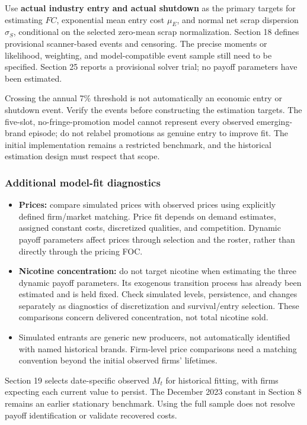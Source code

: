 \documentclass[10pt,]{article}
\providecommand{\tightlist}{%
  \setlength{\itemsep}{0pt}\setlength{\parskip}{0pt}}
\begin{document}
Use \textbf{actual industry entry and actual shutdown} as the primary
targets for estimating \(FC\), exponential mean entry cost \(\mu_E\),
and normal net scrap dispersion \(\sigma_S\), conditional on the
selected zero-mean scrap normalization. Section 18 defines provisional
scanner-based events and censoring. The precise moments or likelihood,
weighting, and model-compatible event sample still need to be specified.
Section 25 reports a provisional solver trial; no payoff parameters have
been estimated.

Crossing the annual 7\% threshold is not automatically an economic entry
or shutdown event. Verify the events before constructing the estimation
targets. The five-slot, no-fringe-promotion model cannot represent every
observed emerging-brand episode; do not relabel promotions as genuine
entry to improve fit. The initial implementation remains a restricted
benchmark, and the historical estimation design must respect that scope.

\subsubsection{Additional model-fit
diagnostics}\label{additional-model-fit-diagnostics}

\begin{itemize}
\tightlist
\item
  \textbf{Prices:} compare simulated prices with observed prices using
  explicitly defined firm/market matching. Price fit depends on demand
  estimates, assigned constant costs, discretized qualities, and
  competition. Dynamic payoff parameters affect prices through selection
  and the roster, rather than directly through the pricing FOC.
\item
  \textbf{Nicotine concentration:} do not target nicotine when
  estimating the three dynamic payoff parameters. Its exogenous
  transition process has already been estimated and is held fixed. Check
  simulated levels, persistence, and changes separately as diagnostics
  of discretization and survival/entry selection. These comparisons
  concern delivered concentration, not total nicotine sold.
\item
  Simulated entrants are generic new producers, not automatically
  identified with named historical brands. Firm-level price comparisons
  need a matching convention beyond the initial observed firms'
  lifetimes.
\end{itemize}

Section 19 selects date-specific observed \(M_t\) for historical
fitting, with firms expecting each current value to persist. The
December 2023 constant in Section 8 remains an earlier stationary
benchmark. Using the full sample does not resolve payoff identification
or validate recovered costs.
\end{document}
